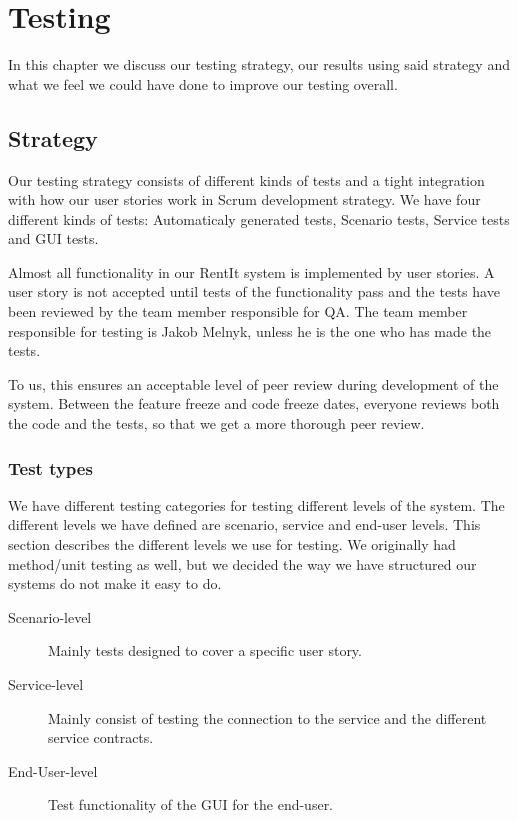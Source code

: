 \chapter{Testing}
\label{testing}
In this chapter we discuss our testing strategy, our results using said strategy and what we feel we could have done to improve our testing overall. 

\section{Strategy}
\label{testing_strategy}
Our testing strategy consists of different kinds of tests and a tight integration with how our user stories work in Scrum development strategy. We have four different kinds of tests: Automaticaly generated tests, Scenario tests, Service tests and GUI tests. 

Almost all functionality in our RentIt system is implemented by user stories. A user story is not accepted until tests of the functionality pass and the tests have been reviewed by the team member responsible for QA. The team member responsible for testing is Jakob Melnyk, unless he is the one who has made the tests. 

To us, this ensures an acceptable level of peer review during development of the system. Between the feature freeze and code freeze dates, everyone reviews both the code and the tests, so that we get a more thorough peer review.

\subsection{Test types}
\label{testing_strategy_types}
We have different testing categories for testing different levels of the system. The different levels we have defined are scenario, service and end-user levels. This section describes the different levels we use for testing. We originally had method/unit testing as well, but we decided the way we have structured our systems do not make it easy to do.

\begin{description}
\item[Scenario-level]Mainly tests designed to cover a specific user story.
\item[Service-level]Mainly consist of testing the connection to the service and the different service contracts.
\item[End-User-level]Test functionality of the GUI for the end-user.
\end{description}

